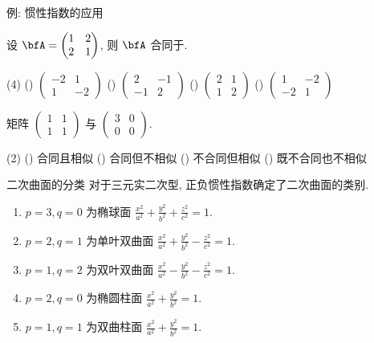 \begin{frame}{例: 惯性指数的应用}
	\onslide<+->
	\begin{example}
		设 $\bfA=\begin{pmatrix}
			1&2\\2&1
		\end{pmatrix}$, 则 $\bfA$ 合同于.
		\begin{taskschoice}(4)
			() $\begin{pmatrix}-2&1\\1&-2\end{pmatrix}$
			() $\begin{pmatrix}2&-1\\-1&2\end{pmatrix}$
			() $\begin{pmatrix}2&1\\1&2\end{pmatrix}$
			() $\begin{pmatrix}1&-2\\-2&1\end{pmatrix}$
		\end{taskschoice}
	\end{example}
	\onslide
	\begin{example}
		矩阵 $\begin{pmatrix}
			1&1\\1&1
		\end{pmatrix}$ 与 $\begin{pmatrix}
			3&0\\0&0
		\end{pmatrix}$\fillbraceframe{B}.
		\begin{taskschoice}(2)
			() 合同且相似
			() 合同但不相似
			() 不合同但相似
			() 既不合同也不相似
		\end{taskschoice}
	\end{example}
\end{frame}


\begin{frame}{二次曲面的分类}
	\onslide<+->
	对于三元实二次型, 正负惯性指数确定了二次曲面的类别.
	\begin{enumerate}
		\item $p=3,q=0$ 为椭球面 $\displaystyle\frac{x^2}{a^2}+\frac{y^2}{b^2}+\frac{z^2}{c^2}=1$.
		\item $p=2,q=1$ 为单叶双曲面 $\displaystyle\frac{x^2}{a^2}+\frac{y^2}{b^2}-\frac{z^2}{c^2}=1$.
		\item $p=1,q=2$ 为双叶双曲面 $\displaystyle\frac{x^2}{a^2}-\frac{y^2}{b^2}-\frac{z^2}{c^2}=1$.
		\item $p=2,q=0$ 为椭圆柱面 $\displaystyle\frac{x^2}{a^2}+\frac{y^2}{b^2}=1$.
		\item $p=1,q=1$ 为双曲柱面 $\displaystyle\frac{x^2}{a^2}+\frac{y^2}{b^2}=1$.
	\end{enumerate}
\end{frame}


